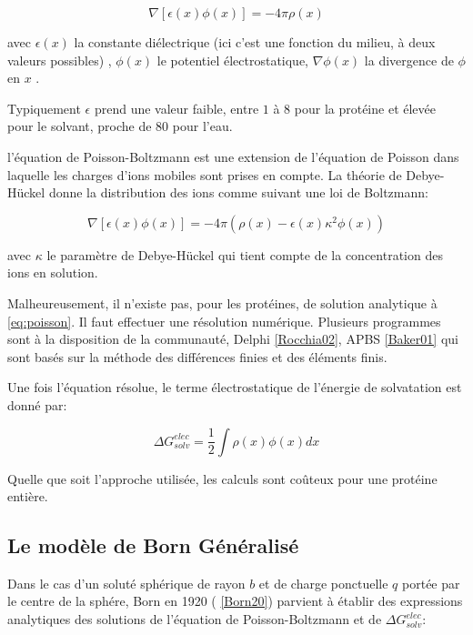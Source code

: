 \begin{equation}
  \label{eq:poisson}
  \nabla [ \epsilon(x) \phi(x)] = - 4 \pi \rho(x)   
\end{equation}

avec $\epsilon(x)$ la constante diélectrique (ici c'est une fonction du milieu, à deux valeurs possibles) , $\phi (x)$ le potentiel électrostatique, $\nabla \phi(x)$ la divergence de $\phi$ en $x$ .

Typiquement $\epsilon$ prend une valeur faible, entre $1$ à $8$ pour la protéine et élevée pour le solvant, proche de $80$ pour l'eau.

l'équation de Poisson-Boltzmann est une extension de l'équation de Poisson dans laquelle les charges d'ions mobiles sont prises en compte. La théorie de Debye-Hückel donne la distribution des ions comme suivant une loi de Boltzmann:

\begin{equation}
  \nabla [ \epsilon (x) \phi(x)] = -4 \pi ( \rho(x) - \epsilon(x) \kappa^2 \phi(x))
\end{equation}

avec $ \kappa $ le paramètre de Debye-Hückel qui tient compte de la concentration des ions en solution.


Malheureusement, il n'existe pas, pour les protéines, de solution analytique à \ref{eq:poisson}. Il faut effectuer une résolution numérique. Plusieurs programmes sont à la disposition de la communauté, Delphi \ref{Rocchia02}, APBS \ref{Baker01}  qui sont basés sur la méthode des différences finies et des éléments finis.

Une fois l'équation résolue, le terme électrostatique de l'énergie de solvatation est donné par:

\begin{equation}
\Delta G_{solv}^{elec} = \frac{1}{2} \int \rho(x)\phi(x)dx  
\end{equation}

Quelle que soit l'approche utilisée, les calculs sont coûteux pour une protéine entière.


\subsection{Le modèle de Born Généralisé}
\label{sub:GB}
Dans le cas d'un soluté sphérique de rayon $b$ et de charge ponctuelle $q$ portée par le centre de la sphére, Born en 1920 ( \ref{Born20}) parvient à établir des expressions analytiques des solutions de l'équation de Poisson-Boltzmann et de $ \Delta G_{solv}^{elec}$:


